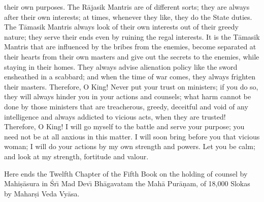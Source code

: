 their own purposes. The R\=ajasik Mantris are of different sorts; they are always after their own interests; at times, whenever they like, they do the State duties. The T\=amasik Mantris always look of their own interests out of their greedy nature; they serve their ends even by ruining the regal interests. It is the T\=amasik Mantris that are influenced by the bribes from the enemies, become separated at their hearts from their own masters and give out the secrets to the enemies, while staying in their homes. They always advise alienation policy like the sword ensheathed in a scabbard; and when the time of war comes, they always frighten their masters. Therefore, O King! Never put your trust on ministers; if you do so, they will always hinder you in your actions and counsels; what harm cannot be done by those ministers that are treacherous, greedy, deceitful and void of any intelligence and always addicted to vicious acts, when they are trusted! Therefore, O King! I will go myself to the battle and serve your purpose; you need not be at all anxious in this matter. I will soon bring before you that vicious woman; I will do your actions by my own strength and powers. Let you be calm; and look at my strength, fortitude and valour.

Here ends the Twelfth Chapter of the Fifth Book on the holding of counsel by Mahi\d{s}\=asura in \'Sr\={\i} Mad Dev\={\i} Bh\=agavatam the Mah\=a Pur\=a\d{n}am, of 18,000 Slokas by Mahar\d{s}i Veda Vy\=asa.



